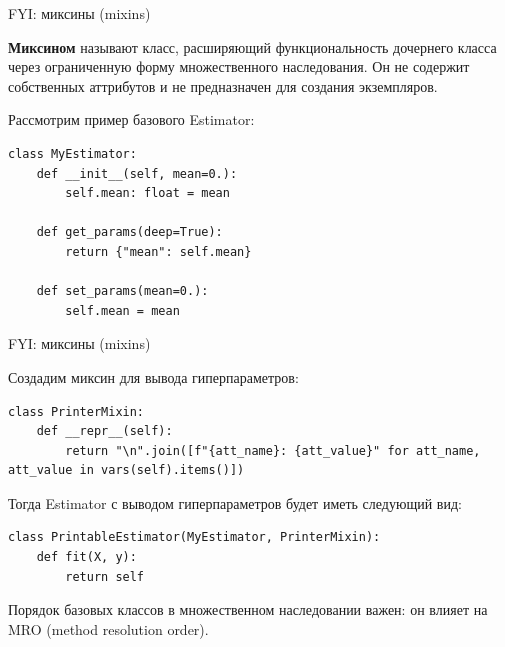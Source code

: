 \documentclass{beamer}
\begin{document}
\begin{frame}[fragile]{FYI: миксины (mixins)}
    \small

    \textbf{Миксином} называют класс, расширяющий функциональность дочернего класса через ограниченную форму множественного наследования. Он не содержит собственных аттрибутов и не предназначен для создания экземпляров.
    
    \vspace{10pt}
    Рассмотрим пример базового Estimator:

    \begin{lstlisting}
class MyEstimator:
    def __init__(self, mean=0.):
        self.mean: float = mean

    def get_params(deep=True):
        return {"mean": self.mean}

    def set_params(mean=0.):
        self.mean = mean\end{lstlisting}
    
\end{frame}

\begin{frame}[fragile]{FYI: миксины (mixins)}
    \small

    Создадим миксин для вывода гиперпараметров:
    \begin{lstlisting}
class PrinterMixin:
    def __repr__(self):
        return "\n".join([f"{att_name}: {att_value}" for att_name, att_value in vars(self).items()])\end{lstlisting}

    Тогда Estimator с выводом гиперпараметров будет иметь следующий вид:
    \begin{lstlisting}
class PrintableEstimator(MyEstimator, PrinterMixin):
    def fit(X, y):
        return self\end{lstlisting}

    Порядок базовых классов в множественном наследовании важен: он влияет на MRO (method resolution order).
\end{frame}
\end{document}
